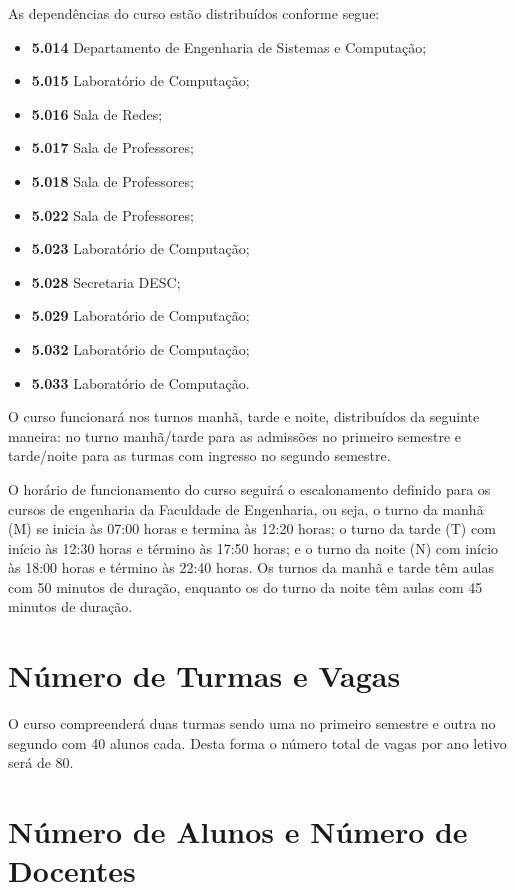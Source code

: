 As dependências do curso estão distribuídos conforme segue:
\begin{itemize}
    \item \textbf{5.014} Departamento de Engenharia de Sistemas e Computação;
    \item \textbf{5.015} Laboratório de Computação;
    \item \textbf{5.016} Sala de Redes;
    \item \textbf{5.017} Sala de Professores;
    \item \textbf{5.018} Sala de Professores;
    \item \textbf{5.022} Sala de Professores;
    \item \textbf{5.023} Laboratório de Computação;
    \item \textbf{5.028} Secretaria DESC;
    \item \textbf{5.029} Laboratório de Computação;
    \item \textbf{5.032} Laboratório de Computação;
    \item \textbf{5.033} Laboratório de Computação.
\end{itemize}

O curso funcionará nos turnos manhã, tarde e noite, distribuídos da seguinte maneira: no turno manhã/tarde para as admissões no primeiro semestre e tarde/noite para as turmas com ingresso no segundo semestre.  

O horário de funcionamento do curso seguirá o escalonamento definido para os cursos de engenharia da Faculdade de Engenharia, ou seja, o turno da manhã (M) se inicia às 07:00 horas e termina às 12:20 horas; o turno da tarde (T) com início às 12:30 horas e término às 17:50 horas; e o turno da noite (N) com início às 18:00 horas e término às 22:40 horas. Os turnos da manhã e tarde têm aulas com 50 minutos de duração, enquanto os do turno da noite têm aulas com 45 minutos de duração.  

\section{Número de Turmas e Vagas}

O curso compreenderá duas turmas sendo uma no primeiro semestre e outra no segundo com 40 alunos cada. Desta forma o número total de vagas por ano letivo será de 80.

\section{Número de Alunos e Número de Docentes}

